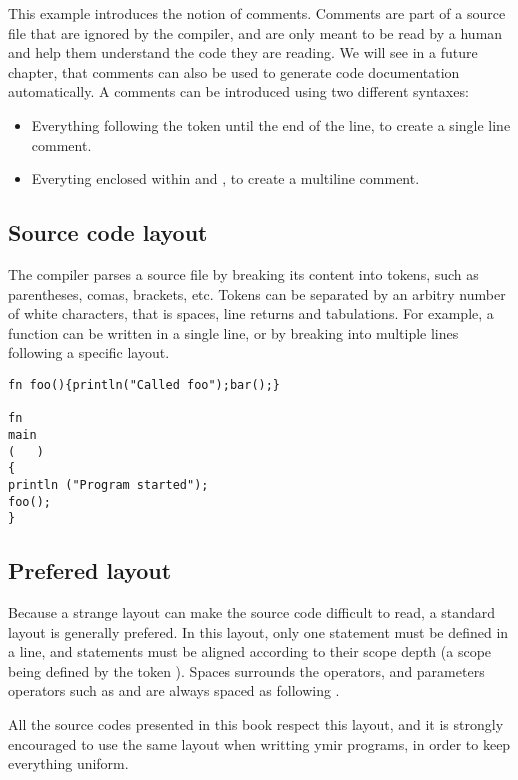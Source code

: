 This example introduces the notion of comments. Comments are part of a source
file that are ignored by the compiler, and are only meant to be read by a human
and help them understand the code they are reading. We will see in a future
chapter, that comments can also be used to generate code documentation
automatically. A comments can be introduced using two different syntaxes:
\begin{itemize}
\item Everything following the token \token{//} until the end of the line, to
  create a single line comment.
\item Everyting enclosed within \token{/*} and \token{*/}, to create a multiline comment.
\end{itemize}

\subsection{Source code layout}

The compiler parses a source file by breaking its content into tokens, such as
parentheses, comas, brackets, etc. Tokens can be separated by an arbitry number
of white characters, that is spaces, line returns and tabulations. For example,
a function can be written in a single line, or by breaking into multiple lines
following a specific layout.


\begin{lstlisting}[style=coloredverbatim]
fn foo(){println("Called foo");bar();}

fn
main
(   )
{
println ("Program started");
foo();
}
\end{lstlisting}

\subsection{Prefered layout}

Because a strange layout can make the source code difficult to read, a standard
layout is generally prefered. In this layout, only one statement must be defined
in a line, and statements must be aligned according to their scope depth (a
scope being defined by the token \token{\{\}}). Spaces surrounds the operators,
and parameters operators such as \token{()} and \token{[]} are always spaced
as following .

All the source codes presented in this book respect this layout, and it is
strongly encouraged to use the same layout when writting ymir programs, in order
to keep everything uniform.

